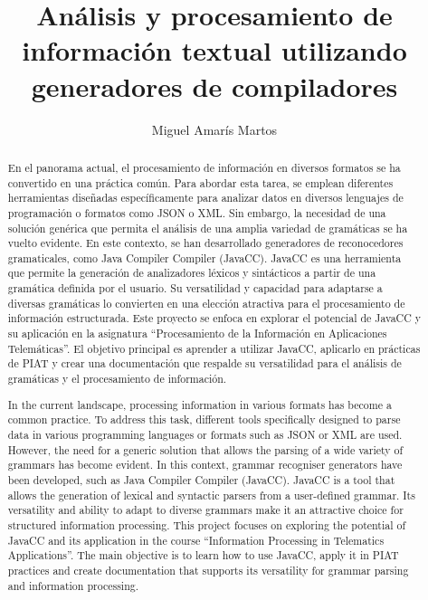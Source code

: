 \documentclass[12pt]{report}
\title{Análisis y procesamiento de información textual utilizando generadores de compiladores}
\author{Miguel Amarís Martos}
\begin{document}
\hypersetup{pageanchor=false}
\begin{titlepage}
    \thispagestyle{empty}
    
\end{titlepage}

\begin{abstract}
    En el panorama actual, el procesamiento de información en diversos formatos se ha convertido en una práctica común. Para abordar esta tarea, se emplean diferentes herramientas diseñadas específicamente para analizar datos en diversos lenguajes de programación o formatos como JSON o XML. Sin embargo, la necesidad de una solución genérica que permita el análisis de una amplia variedad de gramáticas se ha vuelto evidente.
    En este contexto, se han desarrollado generadores de reconocedores gramaticales, como Java Compiler Compiler (JavaCC). JavaCC es una herramienta que permite la generación de analizadores léxicos y sintácticos a partir de una gramática definida por el usuario. Su versatilidad y capacidad para adaptarse a diversas gramáticas lo convierten en una elección atractiva para el procesamiento de información estructurada.
    Este proyecto se enfoca en explorar el potencial de JavaCC y su aplicación en la asignatura ``Procesamiento de la Información en Aplicaciones Telemáticas''. El objetivo principal es aprender a utilizar JavaCC, aplicarlo en prácticas de PIAT y crear una documentación que respalde su versatilidad para el análisis de gramáticas y el procesamiento de información.
\end{abstract}

\renewcommand{\abstractname}{Abstract} %
\begin{abstract}
    In the current landscape, processing information in various formats has become a common practice. To address this task, different tools specifically designed to parse data in various programming languages or formats such as JSON or XML are used. However, the need for a generic solution that allows the parsing of a wide variety of grammars has become evident.
    In this context, grammar recogniser generators have been developed, such as Java Compiler Compiler (JavaCC). JavaCC is a tool that allows the generation of lexical and syntactic parsers from a user-defined grammar. Its versatility and ability to adapt to diverse grammars make it an attractive choice for structured information processing.
    This project focuses on exploring the potential of JavaCC and its application in the course ``Information Processing in Telematics Applications''. The main objective is to learn how to use JavaCC, apply it in PIAT practices and create documentation that supports its versatility for grammar parsing and information processing.
\end{abstract}
\end{document}
